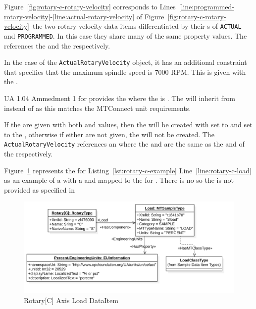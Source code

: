Figure~\ref{fig:rotary-c-rotary-velocity} corresponds to Lines~\ref{line:programmed-rotary-velocity}-\ref{line:actual-rotary-velocity} of Figure~\ref{fig:rotary-c-rotary-velocity}--the two rotary velocity data items differentiated by their s of \texttt{ACTUAL} and \texttt{PROGRAMMED}. In this case they share many of the same property values. The  references the  and the  respectively.

In the case of the \texttt{ActualRotaryVelocity} object, it has an additional constraint that specifies that the maximum spindle speed is 7000 RPM. This is given with the . 

UA 1.04 Ammedment 1 \cite{UAAmend1} for  provides the   where the  is . The  will inherit from  instead of   as this matches the MTConnect unit requirements.

If the  are given with both  and  values, then the  will be created with  set to  and  set to the , otherwise if either are not given, the  will not be created. The \texttt{ActualRotaryVelocity} references an  where the  and  are the same as the  and  of the  respectively. 

\FloatBarrier

Figure~\ref{fig:rotary-c-load} represents the   for Listing~\ref{lst:rotary-c-example} Line~\ref{line:rotary-c-load} as an example of a  with a  and mapped to the  for . There is no  so the  is not provided as specified in 

\begin{figure}[ht]
  \centering
  \includegraphics[width=1.0\textwidth]{diagrams/mtconnect-mapping/rotary-c-load.png}
  \caption{Rotary[C] Axis Load DataItem}
  \label{fig:rotary-c-load}
\end{figure}

